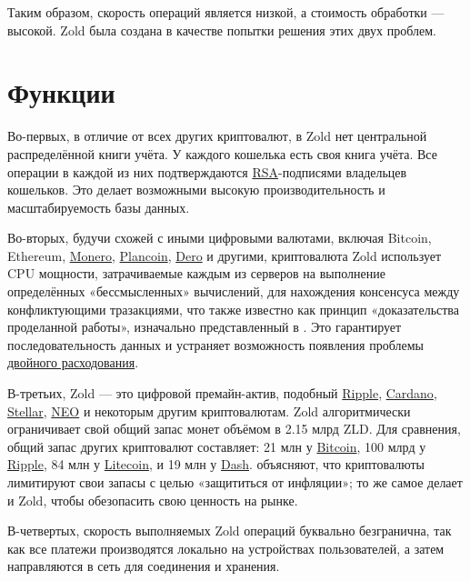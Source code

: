 \documentclass{main}
\begin{document}
Таким образом, скорость операций является низкой, а стоимость обработки ---
высокой. Zold была создана в качестве попытки решения этих двух проблем.

\pagebreak

\section*{Функции}

Во-первых, в отличие от всех других криптовалют, в Zold нет центральной
распределённой книги учёта. У каждого кошелька есть своя книга учёта. Все
операции в каждой из них подтверждаются
\href{https://ru.wikipedia.org/wiki/RSA}{RSA}-подпися\-ми владельцев кошельков. Это
делает возможными высокую производительность и масштабируемость базы данных.

Во-вторых, будучи схожей с иными цифровыми валютами, включая Bitcoin, Ethereum,
\href{https://getmonero.org/}{Monero}, \href{https://plancoin.co/}{Plancoin},
\href{https://dero.io/}{Dero} и другими, криптовалюта Zold использует CPU мощности, затрачиваемые
каждым из серверов на выполнение определённых «бессмысленных» вычислений,
для нахождения консен\-су\-са между конфликтующими тразакциями, что также
известно как принцип «доказательства проделанной работы», изначально представленный 
в \citeyear{back1997}. Это гарантирует последовательность данных и устраняет возможность
появления проблемы
\href{https://ru.wikipedia.org/wiki/%D0%94%D0%B2%D0%BE%D0%B9%D0%BD%D0%BE%D0%B5_%D1%80%D0%B0%D1%81%D1%85%D0%BE%D0%B4%D0%BE%D0%B2%D0%B0%D0%BD%D0%B8%D0%B5}{двойного расходования}.

В-третьих, Zold --- это цифровой премайн-актив, подобный \href{https://ripple.com/}{Rip\-ple},
\href{https://www.cardano.org/en/home/}{Car\-da\-no},
\href{https://www.stellar.org/}{Stellar},
\href{https://neo.org/}{NEO} и некоторым другим криптовалютам.
Zold алгоритмически ограничивает свой общий
запас монет объёмом в 2.15 млрд ZLD. Для сравнения, общий запас других
криптовалют составляет:
21 млн у \href{https://bitcoin.org/}{Bitcoin},
100 млрд у \href{https://ripple.com/}{Ripple},
84 млн у \href{https://litecoin.org/}{Litecoin},
и
19 млн у \href{https://www.dash.org/}{Dash}.
 объясняют, что криптовалюты лимитируют свои запасы с
целью «защититься от инфляции»; то же самое делает и Zold, чтобы обезопасить
свою ценность на рынке.

В-четвертых, скорость выполняемых Zold операций буквально безгранична, так как
все платежи производятся локально на устройствах пользователей, а затем
направляются в сеть для соединения и хранения.
\end{document}
